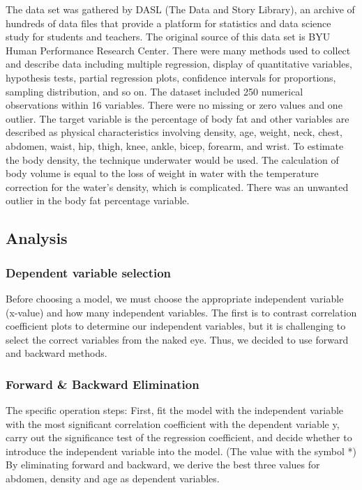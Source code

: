 \documentclass[letterpaper,9pt,twocolumn,twoside,]{pinp}
\begin{document}
The data set was gathered by DASL (The Data and Story Library), an
archive of hundreds of data files that provide a platform for statistics
and data science study for students and teachers. The original source of
this data set is BYU Human Performance Research Center. There were many
methods used to collect and describe data including multiple regression,
display of quantitative variables, hypothesis tests, partial regression
plots, confidence intervals for proportions, sampling distribution, and
so on. The dataset included 250 numerical observations within 16
variables. There were no missing or zero values and one outlier. The
target variable is the percentage of body fat and other variables are
described as physical characteristics involving density, age, weight,
neck, chest, abdomen, waist, hip, thigh, knee, ankle, bicep, forearm,
and wrist. To estimate the body density, the technique underwater would
be used. The calculation of body volume is equal to the loss of weight
in water with the temperature correction for the water's density, which
is complicated. There was an unwanted outlier in the body fat percentage
variable.

\hypertarget{analysis}{%
\subsection{Analysis}\label{analysis}}

\hypertarget{dependent-variable-selection}{%
\subsubsection{Dependent variable
selection}\label{dependent-variable-selection}}

Before choosing a model, we must choose the appropriate independent
variable (x-value) and how many independent variables. The first is to
contrast correlation coefficient plots to determine our independent
variables, but it is challenging to select the correct variables from
the naked eye. Thus, we decided to use forward and backward methods.

\hypertarget{forward-backward-elimination}{%
\subsubsection{Forward \& Backward
Elimination}\label{forward-backward-elimination}}

The specific operation steps: First, fit the model with the independent
variable with the most significant correlation coefficient with the
dependent variable y, carry out the significance test of the regression
coefficient, and decide whether to introduce the independent variable
into the model. (The value with the symbol *) By eliminating forward and
backward, we derive the best three values for abdomen, density and age
as dependent variables.
\end{document}
